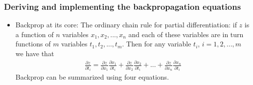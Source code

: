 \documentclass[norsk,a4paper,11pt]{article}
\begin{document}
\subsubsection{Deriving and implementing the backpropagation equations}
\begin{itemize}
	\item Backprop at its core: The ordinary chain rule for partial differentiation: if $z$ is a function of $n$ variables $x_1, x_2, ..., x_n$ and each of these variables are in turn functions of $m$ variables $t_1, t_2, ..., t_m$. Then for any variable $t_i$, $i=1,2,...,m$ we have that
	\begin{align}
		\frac{\partial z}{\partial t_i} = \frac{\partial z}{\partial x_1} \frac{\partial x_1}{\partial t_i} + \frac{\partial z}{\partial x_2} \frac{\partial x_2}{\partial t_i} + ... + \frac{\partial z}{\partial x_n} \frac{\partial x_n}{\partial t_i}
	\end{align}	
	Backprop can be summarized using four equations.


\end{itemize}
\end{document}

